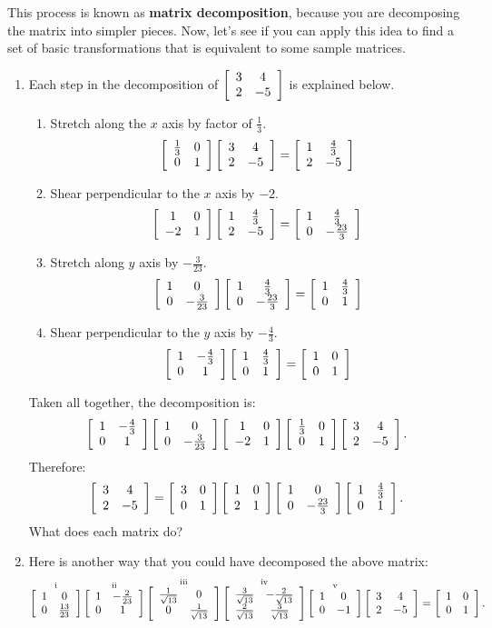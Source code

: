 \documentclass[../gatm.tex]{subfiles}
\begin{document}
\noindent This process is known as \textbf{matrix decomposition}, because you are decomposing the matrix into simpler pieces. Now, let's see if you can apply this idea to find a set of basic transformations that is equivalent to some sample matrices.

\begin{enumerate}
\setcounter{enumi}{\value{problem_i}}
\item \label{prob:needed_for_matrix_undo1}Each step in the decomposition of $\twomat{3}{4}{2}{-5}$ is explained below.
\begin{multicols}{2}
\begin{enumerate}[label=(\roman*)]
\item Stretch along the $x$ axis by factor of $\frac{1}{3}$. %
$$\twomat{\frac{1}{3}}{0}{0}{1}\twomat{3}{4}{2}{-5}=\twomat{1}{\frac{4}{3}}{2}{-5}$$
\item Shear perpendicular to the $x$ axis by $-2$. %
$$\twomat{1}{0}{-2}{1}\twomat{1}{\frac{4}{3}}{2}{-5}=\twomat{1}{\frac{4}{3}}{0}{-\frac{23}{3}}$$
\item Stretch along $y$ axis by $-\frac{3}{23}$. %
$$\twomat{1}{0}{0}{-\frac{3}{23}}\twomat{1}{\frac{4}{3}}{0}{-\frac{23}{3}}=\twomat{1}{\frac{4}{3}}{0}{1}$$
\item Shear perpendicular to the $y$ axis by $-\frac{4}{3}$. %
$$\twomat{1}{-\frac{4}{3}}{0}{1}\twomat{1}{\frac{4}{3}}{0}{1}=\twomat{1}{0}{0}{1}$$
\end{enumerate}
\end{multicols}
Taken all together, the decomposition is:
$$\twomat{1}{-\frac{4}{3}}{0}{1}\twomat{1}{0}{0}{-\frac{3}{23}}\twomat{1}{0}{-2}{1}\twomat{\frac{1}{3}}{0}{0}{1}\twomat{3}{4}{2}{-5}.$$
Therefore: $$\twomat{3}{4}{2}{-5}=\twomat{3}{0}{0}{1}\twomat{1}{0}{2}{1}\twomat{1}{0}{0}{-\frac{23}{3}}\twomat{1}{\frac{4}{3}}{0}{1}.$$
What does each matrix do?
\item\label{prob:needed_for_matrix_undo2}Here is another way that you could have decomposed the above matrix:
\vspace{-1em}
$$\mathop{\twomat{1}{0}{0}{\frac{13}{23}}}^{\text{i}}
\mathop{\twomat{1}{-\frac{2}{23}}{0}{1}}^{\text{ii}}
\mathop{\twomat{\frac{1}{\sqrt{13}}}{0}{0}{\frac{1}{\sqrt{13}}}}^{\text{iii}}
\mathop{\twomat{\frac{3}{\sqrt{13}}}{-\frac{2}{\sqrt{13}}}{\frac{2}{\sqrt{13}}}{\frac{3}{\sqrt{13}}}}^{\text{iv}}
\mathop{\twomat{1}{0}{0}{-1}}^{\text{v}}
\twomat{3}{4}{2}{-5}=\twomat{1}{0}{0}{1}.$$
\begin{enumerate}

\end{enumerate}
\end{enumerate}
\end{document}
